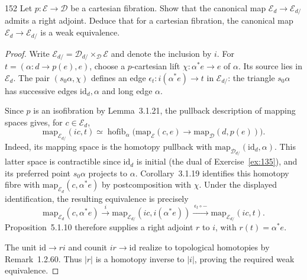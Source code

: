 \begin{exercise}{152}
Let $p\colon\mathcal{E}\to\mathcal{D}$ be a cartesian fibration. Show that the canonical map $\mathcal{E}_d\to\mathcal{E}_{d/}$
admits a right adjoint. Deduce that for a cartesian fibration, the canonical map $\mathcal{E}_d\to\mathcal{E}_{d/}$
is a weak equivalence.

\begin{proof}
Write $\mathcal{E}_{d/}=\mathcal{D}_{d/}\times_{\mathcal{D}}\mathcal{E}$
and denote the inclusion by $i$.
For $t=(\alpha\colon d\to p(e),e)$, choose a $p$-cartesian lift
$\chi\colon\alpha^*e\to e$ of $\alpha$.
Its source lies in $\mathcal{E}_d$.
The pair $(s_0\alpha,\chi)$ defines an edge
$\epsilon_t\colon i(\alpha^*e)\to t$ in $\mathcal{E}_{d/}$:
the triangle $s_0\alpha$ has successive edges $\mathrm{id}_d,\alpha$
and long edge $\alpha$.

Since $p$ is an isofibration by Lemma~3.1.21, the pullback description
of mapping spaces gives, for $c\in\mathcal{E}_d$,
\[
 \mathrm{map}_{\mathcal{E}_{d/}}(ic,t)
 \simeq
 \operatorname{hofib}_{\alpha}\bigl(
   \mathrm{map}_{\mathcal{E}}(c,e)
   \longrightarrow\mathrm{map}_{\mathcal{D}}(d,p(e))\bigr).
\]
Indeed, its mapping space is the homotopy pullback with
$\mathrm{map}_{\mathcal{D}_{d/}}(\mathrm{id}_d,\alpha)$.
This latter space is contractible since $\mathrm{id}_d$ is initial
(the dual of Exercise~\ref{ex:135}),
and its preferred point $s_0\alpha$ projects to $\alpha$.
Corollary~3.1.19 identifies this homotopy fibre with
$\mathrm{map}_{\mathcal{E}_d}(c,\alpha^*e)$ by postcomposition with
$\chi$.
Under the displayed identification, the resulting equivalence is
precisely
\[
 \mathrm{map}_{\mathcal{E}_d}(c,\alpha^*e)
 \xrightarrow{\ i\ }
 \mathrm{map}_{\mathcal{E}_{d/}}(ic,i(\alpha^*e))
 \xrightarrow{\ \epsilon_t\circ-\ }
 \mathrm{map}_{\mathcal{E}_{d/}}(ic,t).
\]
Proposition~5.1.10 therefore supplies a right adjoint $r$ to $i$,
with $r(t)=\alpha^*e$.

The unit $\mathrm{id}\to ri$ and counit $ir\to\mathrm{id}$ realize
to topological homotopies by Remark~1.2.60.
Thus $|r|$ is a homotopy inverse to $|i|$, proving the required
weak equivalence.
\end{proof}
\end{exercise}
